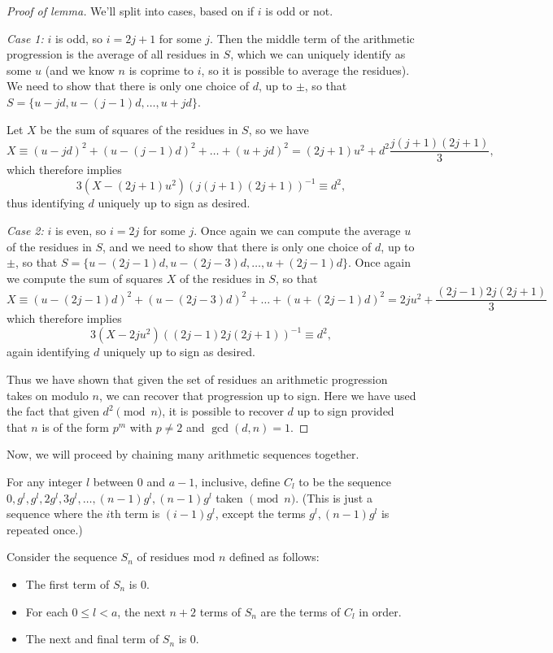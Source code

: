 \documentclass[11pt]{scrartcl}
\begin{document}
\begin{proof}
  [Proof of lemma]
  We'll split into cases, based on if $i$ is odd or not.
  \begin{itemize}
    \ii \textit{Case 1:} $i$ is odd, so $i=2j+1$ for some $j$. Then the middle term of the arithmetic progression is the average of all residues in $S$, which we can uniquely identify as some $u$ (and we know $n$ is coprime to $i$, so it is possible to average the residues). We need to show that there is only one choice of $d$, up to $\pm$, so that $S = \{ u-jd, u-(j-1)d, \dots, u+jd\}$.

    Let $X$ be the sum of squares of the residues in $S$, so we have \[X\equiv (u-jd)^2 + (u-(j-1)d)^2 + \dots + (u+jd)^2 = (2j+1)u^2 + d^2\frac{j(j+1)(2j+1)}{3},\] which therefore implies \[3(X - (2j+1)u^2)(j(j+1)(2j+1))^{-1} \equiv d^2,\] thus identifying $d$ uniquely up to sign as desired.

    \ii \textit{Case 2:} $i$ is even, so $i=2j$ for some $j$. Once again we can compute the average $u$ of the residues in $S$, and we need to show that there is only one choice of $d$, up to $\pm$, so that $S = \{ u-(2j-1)d, u-(2j-3)d, \dots, u+(2j-1)d \}$. Once again we compute the sum of squares $X$ of the residues in $S$, so that \[X \equiv (u-(2j-1)d)^2 + (u-(2j-3)d)^2 + \dots + (u + (2j-1)d)^2 = 2ju^2 + \frac{(2j-1)2j(2j+1)}{3}\] which therefore implies \[3(X-2ju^2) ((2j-1)2j(2j+1))^{-1} \equiv d^2,\] again identifying $d$ uniquely up to sign as desired.
  \end{itemize}

  Thus we have shown that given the set of residues an arithmetic progression takes on modulo $n$, we can recover that progression up to sign. Here we have used the fact that given $d^2 \pmod n$, it is possible to recover $d$ up to sign provided that $n$ is of the form $p^m$ with $p\neq 2$ and $\gcd (d,n)=1$.
\end{proof}

Now, we will proceed by chaining many arithmetic sequences together.

\begin{definition*}
For any integer $l$ between $0$ and $a-1$, inclusive, define $C_l$ to be the sequence $0, g^l, g^l, 2g^l, 3g^l, \dots, (n-1)g^l, (n-1)g^l$ taken $\pmod n$. (This is just a sequence where the $i$th term is $(i-1)g^l$, except the terms $g^l, (n-1)g^l$ is repeated once.)
\end{definition*}

\begin{definition*}
Consider the sequence $S_n$ of residues mod $n$ defined as follows:
\begin{itemize}
  \item The first term of $S_n$ is $0$.
  \item For each $0\le l < a$, the next $n+2$ terms of $S_n$ are the terms of $C_l$ in order.
  \item The next and final term of $S_n$ is $0$.
\end{itemize}
\end{definition*}
\end{document}
